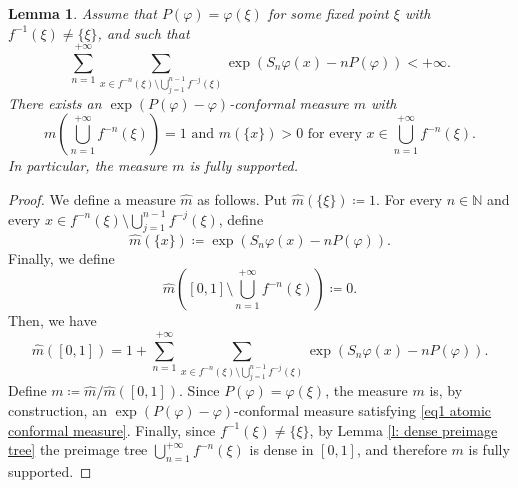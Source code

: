 \documentclass[12pt]{amsart}
\numberwithin{equation}{section} %
\numberwithin{figure}{section} %
\theoremstyle{plain}
\newtheorem{lemm}[prop]{Lemma}
\theoremstyle{definition}
\theoremstyle{remark}
\theoremstyle{citing}
\newcommand{\N}{\mathbb{N}}
\renewcommand{\=}{\coloneqq}
\begin{document}
\begin{lemm}\label{lemma atomic conformal measure}
    Assume that $P(\varphi)= \varphi(\xi)$ for some fixed point $\xi$ with $f^{-1}(\xi) \neq \{\xi\}$, and such that
    \begin{equation}\label{eq series conformal measures}
        \sum_{n=1}^{+\infty}\sum_{x\in f^{-n}(\xi)\setminus\bigcup_{j=1}^{n-1}f^{-j}(\xi)} \exp(S_n\varphi(x) - nP(\varphi)) <+\infty.
    \end{equation}
    There exists an $\exp(P(\varphi)-\varphi)$-conformal measure $m$ with 
    \begin{equation}\label{eq1 atomic conformal measure}
        m\left(\bigcup_{n=1}^{+\infty}f^{-n}(\xi)\right) =1 \text{ and } m(\{x\})>0 \text{ for every }x \in \bigcup_{n=1}^{+\infty}f^{-n}(\xi).
    \end{equation}
    In particular, the measure $m$ is fully supported.
\end{lemm}
\begin{proof}
  We define a measure $\widehat{m}$ as follows. Put $\widehat{m}(\{\xi\})\=1$. For every $n\in \N$ and every $x\in f^{-n}(\xi)\setminus \bigcup_{j=1}^{n-1}f^{-j}(\xi)$, define
  \begin{equation}\label{eq defintion fully atomic conformal measure}
      \widehat{m}(\{x\})\= \exp(S_n\varphi(x) - nP(\varphi)).
  \end{equation}
  Finally, we define 
  \begin{equation*}
      \widehat{m}\left([0,1] \setminus \bigcup_{n=1}^{+\infty}f^{-n}(\xi)\right) \=0.
  \end{equation*}
  Then, we have
  \begin{equation*}
      \widehat{m}([0,1]) =1 +\sum_{n=1}^{+\infty}\sum_{x\in f^{-n}(\xi)\setminus\bigcup_{j=1}^{n-1}f^{-j}(\xi)} \exp(S_n\varphi(x) - nP(\varphi)). 
  \end{equation*}
  Define $m\= \widehat{m}/\widehat{m}([0,1])$. Since $P(\varphi)=\varphi(\xi)$, the measure $m$ is, by construction, an $\exp(P(\varphi)-\varphi)$-conformal measure satisfying \eqref{eq1 atomic conformal measure}. Finally, since $f^{-1}(\xi)\neq \{\xi\}$, by Lemma \ref{l: dense preimage tree} the preimage tree $\bigcup_{n=1}^{+\infty}f^{-n}(\xi)$ is dense in $[0,1]$, and therefore $m$ is fully supported.
\end{proof}
\end{document}
